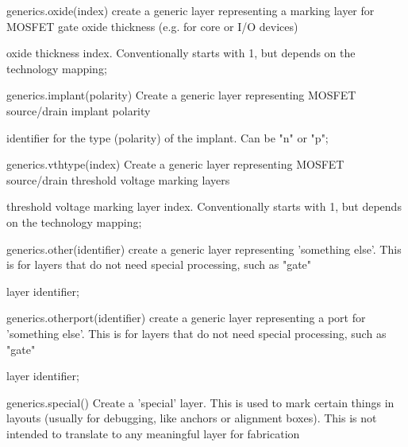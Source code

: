 \begin{APIfunc}{generics.oxide(index)}
    create a generic layer representing a marking layer for MOSFET gate oxide thickness (e.g. for core or I/O devices)
    \begin{APIparameters}
            oxide thickness index. Conventionally starts with 1, but depends on the technology mapping;
    \end{APIparameters}
\end{APIfunc}
\begin{APIfunc}{generics.implant(polarity)}
    Create a generic layer representing MOSFET source/drain implant polarity
    \begin{APIparameters}
            identifier for the type (polarity) of the implant. Can be "n" or "p";
    \end{APIparameters}
\end{APIfunc}
\begin{APIfunc}{generics.vthtype(index)}
    Create a generic layer representing MOSFET source/drain threshold voltage marking layers
    \begin{APIparameters}
            threshold voltage marking layer index. Conventionally starts with 1, but depends on the technology mapping;
    \end{APIparameters}
\end{APIfunc}
\begin{APIfunc}{generics.other(identifier)}
    create a generic layer representing 'something else'. This is for layers that do not need special processing, such as "gate"
    \begin{APIparameters}
            layer identifier;
    \end{APIparameters}
\end{APIfunc}
\begin{APIfunc}{generics.otherport(identifier)}
    create a generic layer representing a port for 'something else'. This is for layers that do not need special processing, such as "gate"
    \begin{APIparameters}
            layer identifier;
    \end{APIparameters}
\end{APIfunc}
\begin{APIfunc}{generics.special()}
    Create a 'special' layer. This is used to mark certain things in layouts (usually for debugging, like anchors or alignment boxes). This is not intended to translate to any meaningful layer for fabrication
    \begin{APIparameters}
    \end{APIparameters}
\end{APIfunc}
